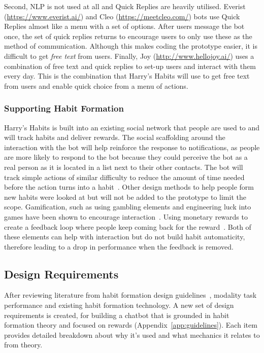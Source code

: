 Second, NLP is not used at all and Quick Replies are heavily utilised. Everist (\url{https://www.everist.ai/}) and Cleo (\url{https://meetcleo.com/}) bots use Quick Replies almost like a menu with a set of options. After users message the bot once, the set of quick replies returns to encourage users to only use these as the method of communication. Although this makes coding the prototype easier, it is difficult to get \textit{free text} from users. Finally, Joy (\url{http://www.hellojoy.ai/}) uses a combination of free text and quick replies to set-up users and interact with them every day. This is the combination that Harry's Habits will use to get free text from users and enable quick choice from a menu of actions.


\subsubsection*{Supporting Habit Formation}
Harry's Habits is built into an existing social network that people are used to and will track habits and deliver rewards. The social scaffolding around the interaction with the bot will help reinforce the response to notifications, as people are more likely to respond to the bot because they could perceive the bot as a real person as it is located in a list next to their other contacts. The bot will track simple actions of similar difficulty to reduce the amount of time needed before the action turns into a habit~\cite{article_how_habits_formed_modelling_habit_formation}. Other design methods to help people form new habits were looked at but will not be added to the prototype to limit the scope. Gamification, such as using gambling elements and engineering luck into games have been shown to encourage interaction~\cite{article_free_to_play_making_money_from_games_you_give_away}. Using monetary rewards to create a feedback loop where people keep coming back for the reward~\cite{website_how_to_design_feedback_loops}. Both of these elements can help with interaction but do not build habit automaticity, therefore leading to a drop in performance when the feedback is removed.



\subsection{Design Requirements} \label{recommendations}
After reviewing literature from habit formation design guidelines~\cite{article_beyond_self_tracking_designing_apps, article_taxonomy_motivational_affordances_meaningful}, modality task performance and existing habit formation technology. A new set of design requirements is created, for building a chatbot that is grounded in habit formation theory and focused on rewards (Appendix~\ref{app:guidelines}). Each item provides detailed breakdown about why it's used and what mechanics it relates to from theory.


